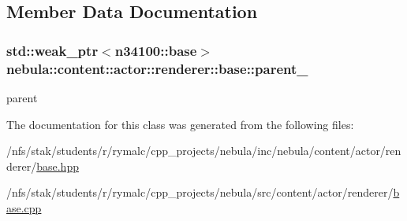\subsection{Member Data Documentation}
\hypertarget{classnebula_1_1content_1_1actor_1_1renderer_1_1base_a0c2ad46f284248c6fa9652263fe3e605}{
\subsubsection[{parent\_\-}]{\setlength{\rightskip}{0pt plus 5cm}std::weak\_\-ptr$<${\bf n34100::base}$>$ {\bf nebula::content::actor::renderer::base::parent\_\-}}}
\label{classnebula_1_1content_1_1actor_1_1renderer_1_1base_a0c2ad46f284248c6fa9652263fe3e605}


parent 

The documentation for this class was generated from the following files:\begin{DoxyCompactItemize}
\item 
/nfs/stak/students/r/rymalc/cpp\_\-projects/nebula/inc/nebula/content/actor/renderer/\hyperlink{inc_2nebula_2content_2actor_2renderer_2base_8hpp}{base.hpp}\item 
/nfs/stak/students/r/rymalc/cpp\_\-projects/nebula/src/content/actor/renderer/\hyperlink{src_2content_2actor_2renderer_2base_8cpp}{base.cpp}\end{DoxyCompactItemize}
